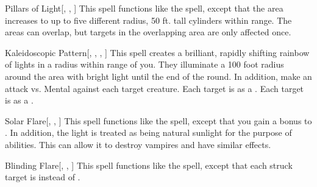 \lowercase{\hypertarget{spell:Pillars of Light}{}}\label{spell:Pillars of Light}
\begin{freeability}[Rank 4]{\hypertarget{spell:Pillars of Light}{Pillars of Light}}[, , ]
This spell functions like the  spell, except that the area increases to up to five different \areasmall radius, 50 ft. tall cylinders within range.
The areas can overlap, but targets in the overlapping area are only affected once.
\end{freeability}
\vspace{0.25em}



\lowercase{\hypertarget{spell:Kaleidoscopic Pattern}{}}\label{spell:Kaleidoscopic Pattern}
\begin{freeability}[Rank 5]{\hypertarget{spell:Kaleidoscopic Pattern}{Kaleidoscopic Pattern}}[, , , ]
This spell creates a brilliant, rapidly shifting rainbow of lights in a \areasmall radius within \rngmed range of you.
They illuminate a 100 foot radius around the area with bright light until the end of the round.
In addition, make an attack vs. Mental against each target creature.
\hit Each target is \dazed as a .
\crit Each target is \disoriented as a .
\end{freeability}
\vspace{0.25em}



\lowercase{\hypertarget{spell:Solar Flare}{}}\label{spell:Solar Flare}
\begin{freeability}[Rank 5]{\hypertarget{spell:Solar Flare}{Solar Flare}}[, , ]
This spell functions like the  spell, except that you gain a  bonus to .
In addition, the light is treated as being natural sunlight for the purpose of abilities.
This can allow it to destroy vampires and have similar effects.
\end{freeability}
\vspace{0.25em}



\lowercase{\hypertarget{spell:Blinding Flare}{}}\label{spell:Blinding Flare}
\begin{freeability}[Rank 7]{\hypertarget{spell:Blinding Flare}{Blinding Flare}}[, , ]
This spell functions like the  spell, except that each struck target is  instead of .
\end{freeability}
\vspace{0.25em}



